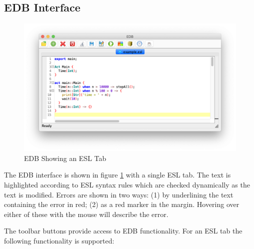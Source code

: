 \documentclass[5p,times]{elsarticle}
\begin{document}
\subsection{EDB Interface}

\label{sec:edb_interface}

\begin{figure}[t]
\centering
\includegraphics[width=\textwidth]{edb}
\caption{EDB Showing an ESL Tab}
\label{fig:edb}
\end{figure}

The EDB interface is shown in figure \ref{fig:edb} with a single ESL tab. The text is highlighted according to ESL syntax rules which are checked dynamically as the text is modified. Errors are shown in two ways: (1) by underlining the text containing the error in red; (2) as a red marker in the margin. Hovering over either of these  with the mouse will describe the error. 

The toolbar buttons provide access to EDB functionality. For an ESL tab the following functionality is supported:
\end{document}
